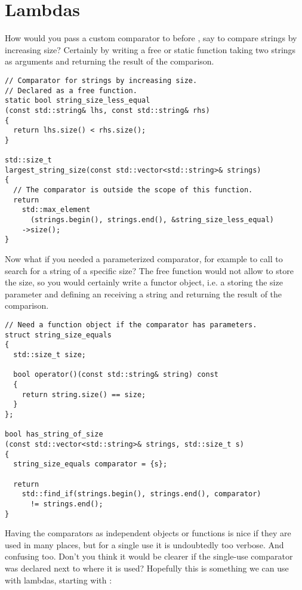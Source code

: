 \section{Lambdas}

How would you pass a custom comparator to 
before , say to compare strings by increasing size? Certainly by
writing a free or static function taking two strings as arguments and
returning the result of the comparison.

\begin{lstlisting}
// Comparator for strings by increasing size.
// Declared as a free function.
static bool string_size_less_equal
(const std::string& lhs, const std::string& rhs)
{
  return lhs.size() < rhs.size();
}

std::size_t
largest_string_size(const std::vector<std::string>& strings)
{
  // The comparator is outside the scope of this function.
  return
    std::max_element
      (strings.begin(), strings.end(), &string_size_less_equal)
    ->size();
}
\end{lstlisting}

Now what if you needed a parameterized comparator, for example to call
 to search for a string of a specific size? The
free function would not allow to store the size, so you would
certainly write a functor object, i.e. a  storing the
size parameter and defining an  receiving a string
and returning the result of the comparison.

\begin{lstlisting}
// Need a function object if the comparator has parameters.
struct string_size_equals
{
  std::size_t size;
    
  bool operator()(const std::string& string) const
  {
    return string.size() == size;
  }
};
  
bool has_string_of_size
(const std::vector<std::string>& strings, std::size_t s)
{
  string_size_equals comparator = {s};

  return
    std::find_if(strings.begin(), strings.end(), comparator)
      != strings.end();
}
\end{lstlisting}

Having the comparators as independent objects or functions is nice if
they are used in many places, but for a single use it is undoubtedly
too verbose. And confusing too. Don't you think it would be clearer if
the single-use comparator was declared next to where it is used?
Hopefully this is something we can use with lambdas, starting with
:

